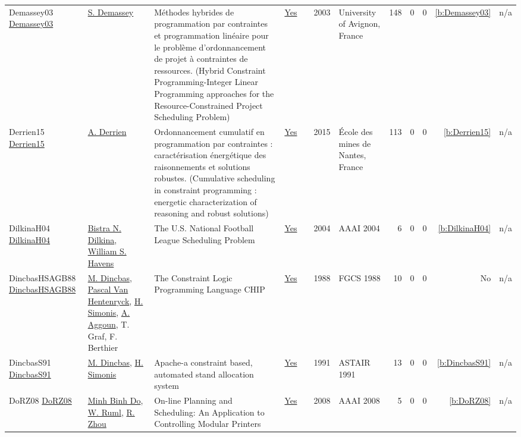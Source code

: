 {\begin{longtable}{>{\raggedright\arraybackslash}p{3cm}>{\raggedright\arraybackslash}p{6cm}>{\raggedright\arraybackslash}p{6.5cm}rrrp{2.5cm}rrrrr}
Demassey03 \href{https://tel.archives-ouvertes.fr/tel-00293564}{Demassey03} & \hyperref[auth:a245]{S. Demassey} & M{\'{e}}thodes hybrides de programmation par contraintes et programmation lin{\'{e}}aire pour le probl{\`{e}}me d'ordonnancement de projet {\`{a}} contraintes de ressources. (Hybrid Constraint Programming-Integer Linear Programming approaches for the Resource-Constrained Project Scheduling Problem) & \href{../works/Demassey03.pdf}{Yes} & \cite{Demassey03} & 2003 & University of Avignon, France & 148 & 0 & 0 & \ref{b:Demassey03} & n/a\\
Derrien15 \href{https://tel.archives-ouvertes.fr/tel-01242789}{Derrien15} & \hyperref[auth:a225]{A. Derrien} & Ordonnancement cumulatif en programmation par contraintes : caract{\'{e}}risation {\'{e}}nerg{\'{e}}tique des raisonnements et solutions robustes. (Cumulative scheduling in constraint programming : energetic characterization of reasoning and robust solutions) & \href{../works/Derrien15.pdf}{Yes} & \cite{Derrien15} & 2015 & {\'{E}}cole des mines de Nantes, France & 113 & 0 & 0 & \ref{b:Derrien15} & n/a\\
DilkinaH04 \href{}{DilkinaH04} & \hyperref[auth:a1360]{Bistra N. Dilkina}, \hyperref[auth:a271]{William S. Havens} & The {U.S.} National Football League Scheduling Problem & \href{../works/DilkinaH04.pdf}{Yes} & \cite{DilkinaH04} & 2004 & AAAI 2004 & 6 & 0 & 0 & \ref{b:DilkinaH04} & n/a\\
DincbasHSAGB88 \href{}{DincbasHSAGB88} & \hyperref[auth:a723]{M. Dincbas}, \hyperref[auth:a149]{Pascal Van Hentenryck}, \hyperref[auth:a17]{H. Simonis}, \hyperref[auth:a731]{A. Aggoun}, T. Graf, F. Berthier & The Constraint Logic Programming Language {CHIP} & \href{../works/DincbasHSAGB88.pdf}{Yes} & \cite{DincbasHSAGB88} & 1988 & FGCS 1988 & 10 & 0 & 0 & No & n/a\\
DincbasS91 \href{}{DincbasS91} & \hyperref[auth:a723]{M. Dincbas}, \hyperref[auth:a17]{H. Simonis} & Apache-a constraint based, automated stand allocation system & \href{../works/DincbasS91.pdf}{Yes} & \cite{DincbasS91} & 1991 & ASTAIR 1991 & 13 & 0 & 0 & \ref{b:DincbasS91} & n/a\\
DoRZ08 \href{http://www.aaai.org/Library/AAAI/2008/aaai08-253.php}{DoRZ08} & \hyperref[auth:a1370]{Minh Binh Do}, \hyperref[auth:a1371]{W. Ruml}, \hyperref[auth:a1372]{R. Zhou} & On-line Planning and Scheduling: An Application to Controlling Modular Printers & \href{../works/DoRZ08.pdf}{Yes} & \cite{DoRZ08} & 2008 & AAAI 2008 & 5 & 0 & 0 & \ref{b:DoRZ08} & n/a\\

\end{longtable}}
